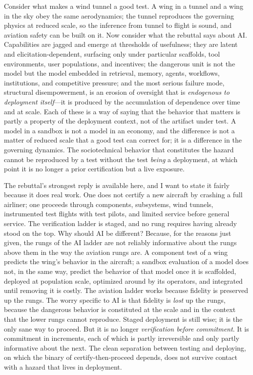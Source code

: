 \documentclass[11pt]{article}
\begin{document}
Consider what makes a wind tunnel a good test. A wing in a tunnel and a wing in the sky obey the same aerodynamics; the tunnel reproduces the governing physics at reduced scale, so the inference from tunnel to flight is sound, and aviation safety can be built on it. Now consider what the rebuttal says about AI. Capabilities are jagged and emerge at thresholds of usefulness; they are latent and elicitation-dependent, surfacing only under particular scaffolds, tool environments, user populations, and incentives; the dangerous unit is not the model but the model embedded in retrieval, memory, agents, workflows, institutions, and competitive pressure; and the most serious failure mode, structural disempowerment, is an erosion of oversight that is \emph{endogenous to deployment itself}---it is produced by the accumulation of dependence over time and at scale. Each of these is a way of saying that the behavior that matters is partly a property of the deployment context, not of the artifact under test. A model in a sandbox is not a model in an economy, and the difference is not a matter of reduced scale that a good test can correct for; it is a difference in the governing dynamics. The sociotechnical behavior that constitutes the hazard cannot be reproduced by a test without the test \emph{being} a deployment, at which point it is no longer a prior certification but a live exposure.

The rebuttal's strongest reply is available here, and I want to state it fairly because it does real work. One does not certify a new aircraft by crashing a full airliner; one proceeds through components, subsystems, wind tunnels, instrumented test flights with test pilots, and limited service before general service. The verification ladder is staged, and no rung requires having already stood on the top. Why should AI be different? Because, for the reasons just given, the rungs of the AI ladder are not reliably informative about the rungs above them in the way the aviation rungs are. A component test of a wing predicts the wing's behavior in the aircraft; a sandbox evaluation of a model does not, in the same way, predict the behavior of that model once it is scaffolded, deployed at population scale, optimized around by its operators, and integrated until removing it is costly. The aviation ladder works because fidelity is preserved up the rungs. The worry specific to AI is that fidelity is \emph{lost} up the rungs, because the dangerous behavior is constituted at the scale and in the context that the lower rungs cannot reproduce. Staged deployment is still wise; it is the only sane way to proceed. But it is no longer \emph{verification before commitment}. It is commitment in increments, each of which is partly irreversible and only partly informative about the next. The clean separation between testing and deploying, on which the binary of certify-then-proceed depends, does not survive contact with a hazard that lives in deployment.
\end{document}
